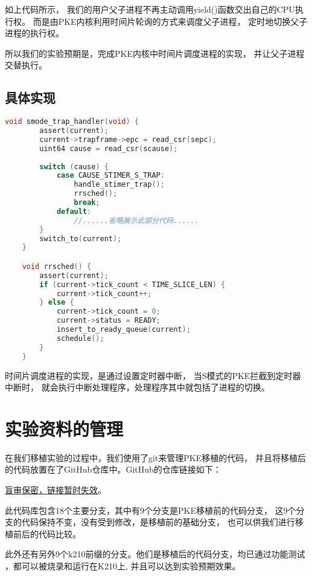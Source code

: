 如上代码所示，
我们的用户父子进程不再主动调用yield()函数交出自己的CPU执行权。
而是由PKE内核利用时间片轮询的方式来调度父子进程，
定时地切换父子进程的执行权。

所以我们的实验预期是，完成PKE内核中时间片调度进程的实现，
并让父子进程交替执行。

\subsection{具体实现}

\begin{lstlisting}[caption={时间片调度}, label={lst:time_slice}, language=C]
    void smode_trap_handler(void) {
        assert(current);
        current->trapframe->epc = read_csr(sepc);
        uint64 cause = read_csr(scause);
    
        switch (cause) {
            case CAUSE_STIMER_S_TRAP:
                handle_stimer_trap();
                rrsched();
                break;
            default:
                //......省略展示此部分代码......
        }
        switch_to(current);
    }

    void rrsched() {
        assert(current);
        if (current->tick_count < TIME_SLICE_LEN) {
            current->tick_count++;
        } else {
            current->tick_count = 0;
            current->status = READY;
            insert_to_ready_queue(current);
            schedule();
        }
    }    
\end{lstlisting}

时间片调度进程的实现，是通过设置定时器中断，
当S模式的PKE拦截到定时器中断时，
就会执行中断处理程序，处理程序其中就包括了进程的切换。

\section{实验资料的管理}

在我们移植实验的过程中，我们使用了git来管理PKE移植的代码，
并且将移植后的代码放置在了GitHub仓库中。GitHub的仓库链接如下：

\href{https://baidu.com}{盲审保密，链接暂时失效}。

此代码库包含18个主要分支，其中有9个分支是PKE移植前的代码分支，
这9个分支的代码保持不变，没有受到修改，是移植前的基础分支，
也可以供我们进行移植前后的代码比较。

此外还有另外9个k210前缀的分支。他们是移植后的代码分支，均已通过功能测试
，都可以被烧录和运行在K210上, 并且可以达到实验预期效果。

